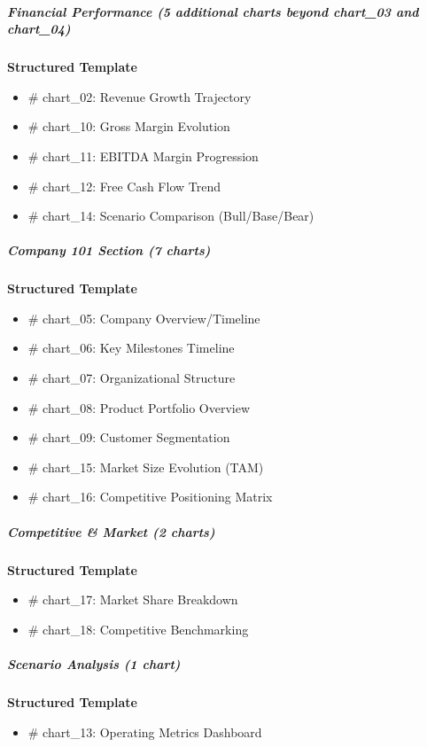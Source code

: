 \documentclass[11pt]{article}
\begin{document}
\subparagraph{Financial Performance (5 additional charts beyond chart\_\allowbreak{}03 and chart\_\allowbreak{}04)}\mbox{}\par
\textbf{Structured Template}
\begin{itemize}[leftmargin=*,itemsep=2pt,topsep=2pt]
\item {} \# chart\_\allowbreak{}02: Revenue Growth Trajectory
\item {} \# chart\_\allowbreak{}10: Gross Margin Evolution
\item {} \# chart\_\allowbreak{}11: EBITDA Margin Progression
\item {} \# chart\_\allowbreak{}12: Free Cash Flow Trend
\item {} \# chart\_\allowbreak{}14: Scenario Comparison (Bull/Base/Bear)
\end{itemize}

\subparagraph{Company 101 Section (7 charts)}\mbox{}\par
\textbf{Structured Template}
\begin{itemize}[leftmargin=*,itemsep=2pt,topsep=2pt]
\item {} \# chart\_\allowbreak{}05: Company Overview/Timeline
\item {} \# chart\_\allowbreak{}06: Key Milestones Timeline
\item {} \# chart\_\allowbreak{}07: Organizational Structure
\item {} \# chart\_\allowbreak{}08: Product Portfolio Overview
\item {} \# chart\_\allowbreak{}09: Customer Segmentation
\item {} \# chart\_\allowbreak{}15: Market Size Evolution (TAM)
\item {} \# chart\_\allowbreak{}16: Competitive Positioning Matrix
\end{itemize}

\subparagraph{Competitive \& Market (2 charts)}\mbox{}\par
\textbf{Structured Template}
\begin{itemize}[leftmargin=*,itemsep=2pt,topsep=2pt]
\item {} \# chart\_\allowbreak{}17: Market Share Breakdown
\item {} \# chart\_\allowbreak{}18: Competitive Benchmarking
\end{itemize}

\subparagraph{Scenario Analysis (1 chart)}\mbox{}\par
\textbf{Structured Template}
\begin{itemize}[leftmargin=*,itemsep=2pt,topsep=2pt]
\item {} \# chart\_\allowbreak{}13: Operating Metrics Dashboard
\end{itemize}
\end{document}
